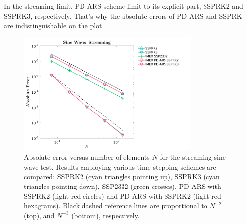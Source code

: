In the streaming limit, PD-ARS scheme limit to its explicit part, SSPRK2 and SSPRK3, respectively.
That's why the absolute errors of PD-ARS and SSPRK are indistinguishable on the plot.

\begin{figure}[h]
  \centering
    \includegraphics[width=0.8\textwidth]{figures/SineWaveStreaming}
   \caption{Absolute error versus number of elements $N$ for the streaming sine wave test.  Results employing various time stepping schemes are compared: SSPRK2 (cyan triangles pointing up), SSPRK3 (cyan triangles pointing down), SSP2332 (green crosses), PD-ARS with SSPRK2 (light red circles) and PD-ARS with SSPRK2 (light red hexagrams). Black dashed reference lines are proportional to $N^{-2}$ (top), and $N^{-3}$ (bottom), respectively.}
   \label{fig: SineWaveStreaming}
\end{figure}

